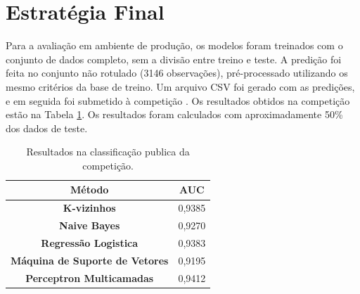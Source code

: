 \section{Estratégia Final}

Para a avaliação em ambiente de produção, os modelos foram treinados com o conjunto de dados completo, sem a divisão entre treino e teste. A predição foi feita no conjunto não rotulado (3146 observações), pré-processado utilizando os mesmo critérios da base de treino. Um arquivo CSV foi gerado com as predições, e em seguida foi submetido à competição \cite{ufscar-am-2024-projeto-final}. Os resultados obtidos na competição estão na Tabela \ref{table:competition}. Os resultados foram calculados com aproximadamente 50\% dos dados de teste.

\begin{table}[!t]
    \renewcommand{\arraystretch}{1.3}
    \caption{Resultados na classificação publica da competição.}
    \label{table:competition}
    \centering
    \begin{tabular}{|c||c|}
        \hline
        \textbf{Método}                        & \textbf{AUC} \\ \hline
        \textbf{K-vizinhos}                    & 0,9385       \\ \hline
        \textbf{Naive Bayes}                   & 0,9270       \\ \hline
        \textbf{Regressão Logistica}           & 0,9383       \\ \hline
        \textbf{Máquina de Suporte de Vetores} & 0,9195       \\ \hline
        \textbf{Perceptron Multicamadas}       & 0,9412       \\ \hline
    \end{tabular}
\end{table}